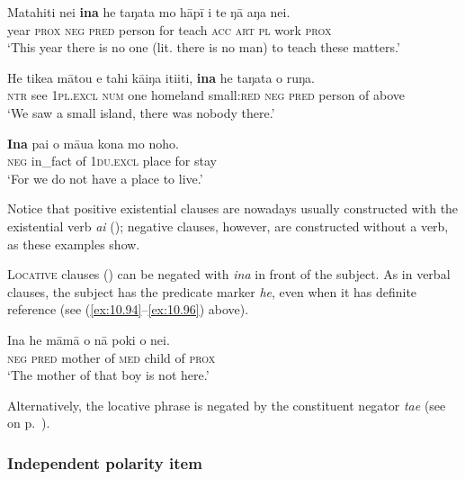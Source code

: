 \ea\label{ex:10.107}
\gll Matahiti nei \textbf{{\ꞌ}ina} he taŋata mo hāpī i te ŋā aŋa nei. \\
year \textsc{prox} \textsc{neg} \textsc{pred} person for teach \textsc{acc} \textsc{art} \textsc{pl} work \textsc{prox} \\

\glt 
‘This year there is no one (lit. there is no man) to teach these matters.’ \textstyleExampleref{[R640.016]} 
\z

\ea\label{ex:10.108}
\gll He tike{\ꞌ}a mātou e tahi kāiŋa {\ꞌ}iti{\ꞌ}iti, \textbf{{\ꞌ}ina} he taŋata o ruŋa. \\
\textsc{ntr} see \textsc{1pl.excl} \textsc{num} one homeland small:\textsc{red} \textsc{neg} \textsc{pred} person of above \\

\glt 
‘We saw a small island, there was nobody there.’ \textstyleExampleref{[Egt-02.409]}
\z

\ea\label{ex:10.109}
\gll {\ꞌ}\textbf{Ina} pa{\ꞌ}i o māua kona mo noho. \\
\textsc{neg} in\_fact of \textsc{1du.excl} place for stay \\

\glt
‘For we do not have a place to live.’ \textstyleExampleref{[R229.210]} 
\z

Notice that positive existential clauses are nowadays usually constructed with the existential verb \textit{ai} (); negative clauses, however, are constructed without a verb, as these examples show.

\textsc{Locative} clauses () can be negated with \textit{{\ꞌ}ina} in front of the subject. As in verbal clauses, the subject has the predicate marker \textit{he}, even when it has definite reference (see (\ref{ex:10.94}–\ref{ex:10.96}) above). 

\ea\label{ex:10.110}
\gll {\ꞌ}Ina he māmā o nā poki o nei. \\
\textsc{neg} \textsc{pred} mother of \textsc{med} child of \textsc{prox} \\

\glt
‘The mother of that boy is not here.’ \textstyleExampleref{[R403.051]} 
\z

Alternatively, the locative phrase is negated by the constituent negator \textit{ta{\ꞌ}e} (see  on p.~\pageref{ex:10.143}).

\subsubsection{Independent polarity item}\label{sec:10.5.1.3}

